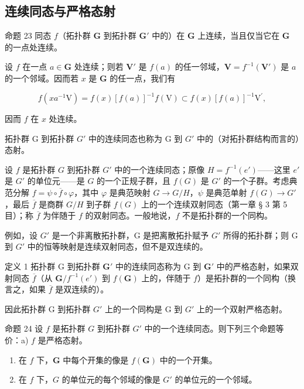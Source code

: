 \subsection{连续同态与严格态射}

命题 23 同态 \(f\)（拓扑群 \(\mathbf{G}\) 到拓扑群 \(\mathbf{G}'\) 中的）在 \(\mathbf{G}\) 上连续，当且仅当它在 \(\mathbf{G}\) 的一点处连续。

设 \(f\) 在一点 \(a \in \mathbf{G}\) 处连续；则若 \(\mathbf{V}'\) 是 \(f(a)\) 的任一邻域，\(\mathbf{V} = f^{-1}(\mathbf{V}')\) 是 \(a\) 的一个邻域。因而若 \(x\) 是 \(\mathbf{G}\) 的任一点，我们有

\[
f (x a ^ {- 1} \mathrm{V}) = f (x) [ f (a) ] ^ {- 1} f (\mathrm{V}) \subset f (x) [ f (a) ] ^ {- 1} \mathrm{V} ^ {\prime},
\]

因而 \(f\) 在 \(x\) 处连续。

拓扑群 G 到拓扑群 \(G'\) 中的连续同态也称为 G 到 \(G'\) 中的（对拓扑群结构而言的）态射。

设 \(f\) 是拓扑群 \(G\) 到拓扑群 \(G'\) 中的一个连续同态；原像 \(H = f^{-1}(e')\)——这里 \(e'\) 是 \(G'\) 的单位元——是 \(G\) 的一个正规子群，且 \(f(G)\) 是 \(G'\) 的一个子群。考虑典范分解 \(f = \psi \circ \overline{f} \circ \varphi\)，其中 \(\varphi\) 是典范映射 \(G \to G/H\)，\(\psi\) 是典范单射 \(f(G) \to G'\)，最后 \(\overline{f}\) 是商群 \(G/H\) 到子群 \(f(G)\) 上的一个连续双射同态（第一章 § 3 第 5 目）；称 \(\overline{f}\) 为伴随于 \(f\) 的双射同态。一般地说，\(f\) 不是拓扑群的一个同构。

例如，设 \(G'\) 是一个非离散拓扑群，G 是把离散拓扑赋予 \(G'\) 所得的拓扑群；则 G 到 \(G'\) 中的恒等映射是连续双射同态，但不是双连续的。

定义 1 拓扑群 G 到拓扑群 \(\mathbf{G}'\) 中的连续同态称为 G 到 \(\mathbf{G}'\) 中的严格态射，如果双射同态 \(\overline{f}\)（从 \(\mathbf{G}/f^{-1}(e')\) 到 \(f(\mathbf{G})\) 上的，伴随于 \(f\)）是拓扑群的一个同构（换言之，如果 \(\overline{f}\) 是双连续的）。

因此拓扑群 G 到拓扑群 \(G'\) 上的一个同构是 G 到 \(G'\) 上的一个双射严格态射。

命题 24 设 \(f\) 是拓扑群 \(G\) 到拓扑群 \(G'\) 中的一个连续同态。则下列三个命题等价：a) \(f\) 是严格态射。

\begin{enumerate}
\def\labelenumi{\alph{enumi})}
\setcounter{enumi}{1}
\item
  在 \(f\) 下，\(\mathbf{G}\) 中每个开集的像是 \(f(\mathbf{G})\) 中的一个开集。
\item
  在 \(f\) 下，\(G\) 的单位元的每个邻域的像是 \(G'\) 的单位元的一个邻域。
\end{enumerate}

